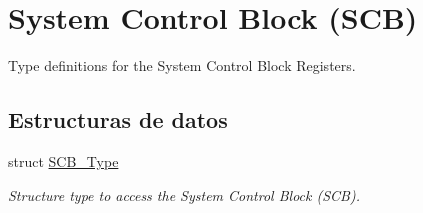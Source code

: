 \hypertarget{group___c_m_s_i_s___s_c_b}{}\section{System Control Block (S\+CB)}
\label{group___c_m_s_i_s___s_c_b}


Type definitions for the System Control Block Registers.  


\subsection*{Estructuras de datos}
\begin{DoxyCompactItemize}
\item 
struct \hyperlink{struct_s_c_b___type}{S\+C\+B\+\_\+\+Type}
\begin{DoxyCompactList}\small\item\em Structure type to access the System Control Block (S\+CB). \end{DoxyCompactList}\end{DoxyCompactItemize}
